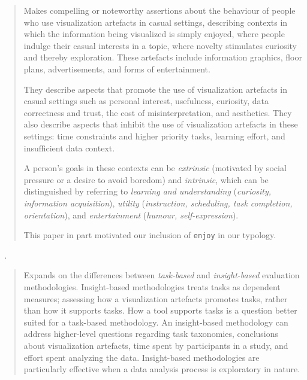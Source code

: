 \begin{quotation}    
    Makes compelling or noteworthy assertions about the behaviour of people who use visualization artefacts in casual settings, describing contexts in which the information being visualized is simply enjoyed, where people indulge their casual interests in a topic, where novelty stimulates curiosity and thereby exploration.
    These artefacts include information graphics, floor plans, advertisements, and forms of entertainment.
    
    They describe aspects that promote the use of visualization artefacts in casual settings such as personal interest, usefulness, curiosity, data correctness and trust, the cost of misinterpretation, and aesthetics. 
    They also describe aspects that inhibit the use of visualization artefacts in these settings: time constraints and higher priority tasks, learning effort, and insufficient data context.

    A person's goals in these contexts can be {\it extrinsic} (motivated by social pressure or a desire to avoid boredom) and {\it intrinsic}, which can be distinguished by referring to {\it learning and understanding} ({\it curiosity, information acquisition}), {\it utility} ({\it instruction, scheduling, task completion, orientation}), and {\it entertainment} ({\it humour, self-expression}).
    
    This paper in part motivated our inclusion of {\tt enjoy} in our typology.
\end{quotation}

\begin{sloppypar}
~\cite{North2011}. \end{sloppypar}

\begin{quotation}
    Expands on the differences between {\it task-based} and {\it insight-based} evaluation methodologies.
    Insight-based methodologies treats tasks as dependent measures; assessing how a visualization artefacts promotes tasks, rather than how it supports tasks.
    How a tool supports tasks is a question better suited for a task-based methodology. 
    An insight-based methodology can address higher-level questions regarding task taxonomies, conclusions about visualization artefacts, time spent by participants in a study, and effort spent analyzing the data. 
    Insight-based methodologies are particularly effective when a data analysis process is exploratory in nature.
\end{quotation}

